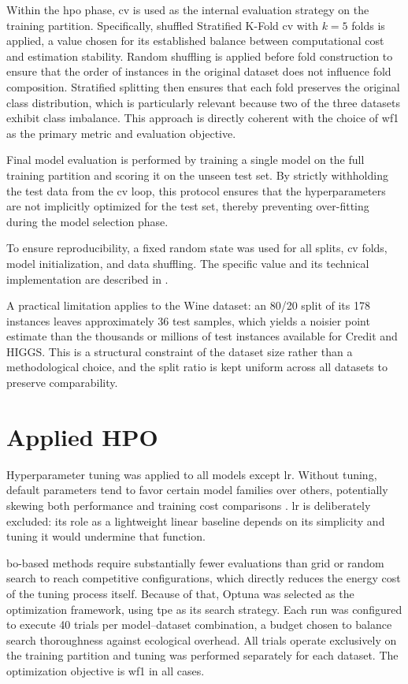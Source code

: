 Within the \gls{hpo} phase, \gls{cv} is used as the internal evaluation strategy on the training partition. Specifically, shuffled Stratified K-Fold \gls{cv} with $k=5$ folds is applied, a value chosen for its established balance between computational cost and estimation stability. Random shuffling is applied before fold construction to ensure that the order of instances in the original dataset does not influence fold composition. Stratified splitting then ensures that each fold preserves the original class distribution, which is particularly relevant because two of the three datasets exhibit class imbalance. This approach is directly coherent with the choice of \gls{wf1} as the primary metric and evaluation objective.

Final model evaluation is performed by training a single model on the full training partition and scoring it on the unseen test set. By strictly withholding the test data from the \gls{cv} loop, this protocol ensures that the hyperparameters are not implicitly optimized for the test set, thereby preventing over-fitting during the model selection phase.

To ensure reproducibility, a fixed random state was used for all splits, \gls{cv} folds, model initialization, and data shuffling. The specific value and its technical implementation are described in .

A practical limitation applies to the Wine dataset: an 80/20 split of its 178 instances leaves approximately 36 test samples, which yields a noisier point estimate than the thousands or millions of test instances available for Credit and HIGGS. This is a structural constraint of the dataset size rather than a methodological choice, and the split ratio is kept uniform across all datasets to preserve comparability.

\section{Applied HPO}
\label{design_hyperparameter}
Hyperparameter tuning was applied to all models except \gls{lr}. Without tuning, default parameters tend to favor certain model families over others, potentially skewing both performance and training cost comparisons \cite{bagnallUseDefaultParameter2017}. \gls{lr} is deliberately excluded: its role as a lightweight linear baseline depends on its simplicity and tuning it would undermine that function.

\gls{bo}-based methods require substantially fewer evaluations than grid or random search to reach competitive configurations, which directly reduces the energy cost of the tuning process itself. Because of that, Optuna was selected as the optimization framework, using \gls{tpe} as its search strategy. Each run was configured to execute 40 trials per model--dataset combination, a budget chosen to balance search thoroughness against ecological overhead. All trials operate exclusively on the training partition and tuning was performed separately for each dataset. The optimization objective is \gls{wf1} in all cases.


